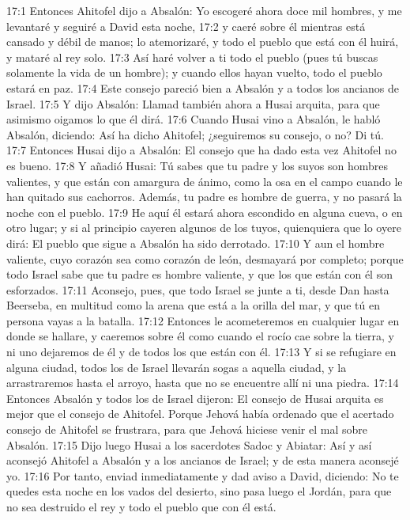 17:1 Entonces Ahitofel dijo a Absalón: Yo escogeré ahora doce mil hombres, y me levantaré y seguiré a David esta noche,  
17:2 y caeré sobre él mientras está cansado y débil de manos; lo atemorizaré, y todo el pueblo que está con él huirá, y mataré al rey solo.  
17:3 Así haré volver a ti todo el pueblo (pues tú buscas solamente la vida de un hombre); y cuando ellos hayan vuelto, todo el pueblo estará en paz.  
17:4 Este consejo pareció bien a Absalón y a todos los ancianos de Israel.  
17:5 Y dijo Absalón: Llamad también ahora a Husai arquita, para que asimismo oigamos lo que él dirá.  
17:6 Cuando Husai vino a Absalón, le habló Absalón, diciendo: Así ha dicho Ahitofel; ¿seguiremos su consejo, o no? Di tú.  
17:7 Entonces Husai dijo a Absalón: El consejo que ha dado esta vez Ahitofel no es bueno.  
17:8 Y añadió Husai: Tú sabes que tu padre y los suyos son hombres valientes, y que están con amargura de ánimo, como la osa en el campo cuando le han quitado sus cachorros. Además, tu padre es hombre de guerra, y no pasará la noche con el pueblo.  
17:9 He aquí él estará ahora escondido en alguna cueva, o en otro lugar; y si al principio cayeren algunos de los tuyos, quienquiera que lo oyere dirá: El pueblo que sigue a Absalón ha sido derrotado.  
17:10 Y aun el hombre valiente, cuyo corazón sea como corazón de león, desmayará por completo; porque todo Israel sabe que tu padre es hombre valiente, y que los que están con él son esforzados.  
17:11 Aconsejo, pues, que todo Israel se junte a ti, desde Dan hasta Beerseba, en multitud como la arena que está a la orilla del mar, y que tú en persona vayas a la batalla.  
17:12 Entonces le acometeremos en cualquier lugar en donde se hallare, y caeremos sobre él como cuando el rocío cae sobre la tierra, y ni uno dejaremos de él y de todos los que están con él.  
17:13 Y si se refugiare en alguna ciudad, todos los de Israel llevarán sogas a aquella ciudad, y la arrastraremos hasta el arroyo, hasta que no se encuentre allí ni una piedra.  
17:14 Entonces Absalón y todos los de Israel dijeron: El consejo de Husai arquita es mejor que el consejo de Ahitofel. Porque Jehová había ordenado que el acertado consejo de Ahitofel se frustrara, para que Jehová hiciese venir el mal sobre Absalón.  
17:15 Dijo luego Husai a los sacerdotes Sadoc y Abiatar: Así y así aconsejó Ahitofel a Absalón y a los ancianos de Israel; y de esta manera aconsejé yo.  
17:16 Por tanto, enviad inmediatamente y dad aviso a David, diciendo: No te quedes esta noche en los vados del desierto, sino pasa luego el Jordán, para que no sea destruido el rey y todo el pueblo que con él está.  

